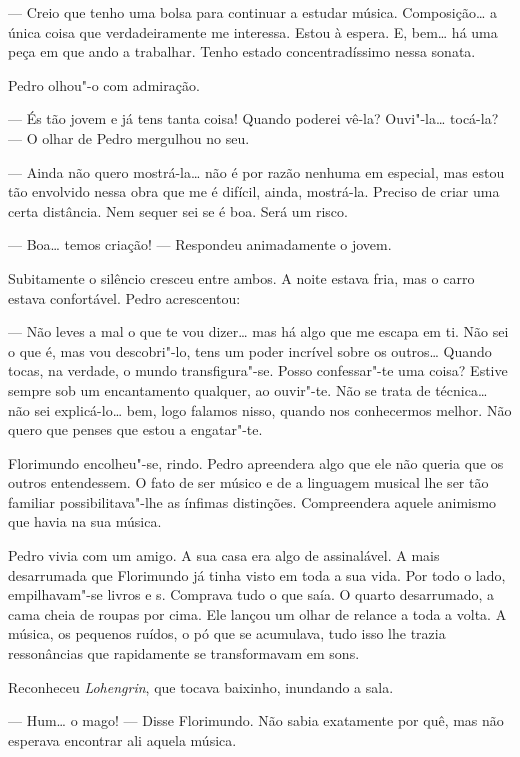 --- Creio que tenho uma bolsa para continuar a estudar música.
Composição\ldots{} a única coisa que verdadeiramente me interessa. Estou à
espera. E, bem\ldots{} há uma peça em que ando a trabalhar. Tenho estado
concentradíssimo nessa sonata.

Pedro olhou"-o com admiração.

--- És tão jovem e já tens tanta coisa! Quando poderei vê-la?
Ouvi"-la\ldots{} tocá-la? --- O olhar de Pedro mergulhou no seu.

--- Ainda não quero mostrá-la\ldots{} não é por razão nenhuma em especial, mas
estou tão envolvido nessa obra que me é difícil, ainda, mostrá-la.
Preciso de criar uma certa distância. Nem sequer sei se é boa. Será um
risco.

--- Boa\ldots{} temos criação! --- Respondeu animadamente o jovem.

Subitamente o silêncio cresceu entre ambos. A noite estava fria, mas o
carro estava confortável. Pedro acrescentou:

--- Não leves a mal o que te vou dizer\ldots{} mas há algo que me escapa em ti.
Não sei o que é, mas vou descobri"-lo, tens um poder incrível sobre os
outros\ldots{} Quando tocas, na verdade, o mundo transfigura"-se. Posso
confessar"-te uma coisa? Estive sempre sob um encantamento qualquer, ao
ouvir"-te. Não se trata de técnica\ldots{} não sei explicá-lo\ldots{} bem, logo
falamos nisso, quando nos conhecermos melhor. Não quero que penses que
estou a engatar"-te.

Florimundo encolheu"-se, rindo. Pedro apreendera algo que ele não queria
que os outros entendessem. O fato de ser músico e de a linguagem
musical lhe ser tão familiar possibilitava"-lhe as ínfimas distinções.
Compreendera aquele animismo que havia na sua música.

Pedro vivia com um amigo. A sua casa era algo de assinalável. A mais
desarrumada que Florimundo já tinha visto em toda a sua vida. Por todo o
lado, empilhavam"-se livros e s. Comprava tudo o que saía. O quarto
desarrumado, a cama cheia de roupas por cima. Ele lançou um olhar de
relance a toda a volta. A música, os pequenos ruídos, o pó que se
acumulava, tudo isso lhe trazia ressonâncias que rapidamente se
transformavam em sons.

Reconheceu \emph{Lohengrin}, que tocava baixinho, inundando a sala.

--- Hum\ldots{} o mago! --- Disse Florimundo. Não sabia exatamente por quê, mas
não esperava encontrar ali aquela música.

